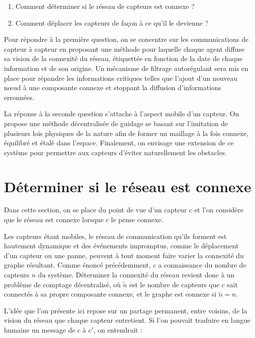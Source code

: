 \documentclass[10pt]{article}
\begin{document}
\begin{multicols}{2}
\begin{enumerate}
\item{Comment déterminer si le réseau de capteurs est connexe ?}
\item{Comment déplacer les capteurs de façon à ce qu'il le devienne ?}
\end{enumerate}

Pour répondre à la première question, on se concentre sur les
communications de capteur à capteur en proposant une méthode pour
laquelle chaque agent diffuse sa vision de la connexité du réseau,
étiquettée en fonction de la date de chaque information et de son
origine. Un mécanisme de filtrage autorégulant sera mis en place pour
répandre les informations critiques telles que l'ajout d'un nouveau
n\oe ud à une composante connexe et stoppant la diffusion
d'informations erronnées.

La réponse à la seconde question s'attache à l'aspect mobile d'un
capteur. On propose une méthode décentralisée de guidage se basant sur
l'imitation de plusieurs lois physiques de la nature afin de former un
maillage à la fois connexe, équilibré et étalé dans
l'espace. Finalement, on envisage une extension de ce système pour
permettre aux capteurs d'éviter naturellement les obstacles.

\section{Déterminer si le réseau est connexe}

Dans cette section, on se place du point de vue d'un capteur $c$ et
l'on considère que le réseau est connexe lorsque $c$ le pense connexe.

Les capteurs étant mobiles, le réseau de communication qu'ils forment
est hautement dynamique et des événements impromptus, comme le
déplacement d'un capteur ou une panne, peuvent à tout moment faire
varier la connexité du graphe résultant. Comme énoncé précédemment,
$c$ a connaissance du nombre de capteurs $n$ du système. Déterminer la
connexité du réseau revient donc à un problème de comptage
décentralisé, o\`u $\tilde{n}$ est le nombre de capteurs que $c$ sait
connectés à sa propre composante connexe, et le graphe est connexe si
$\tilde{n} = n$.

L'idée que l'on présente ici repose sur un partage permanent, entre
voisins, de la vision du réseau que chaque capteur entretient. Si l'on
pouvait traduire en langue humaine un message de $c$ à $c'$, on
entendrait :


\end{multicols}
\end{document}
